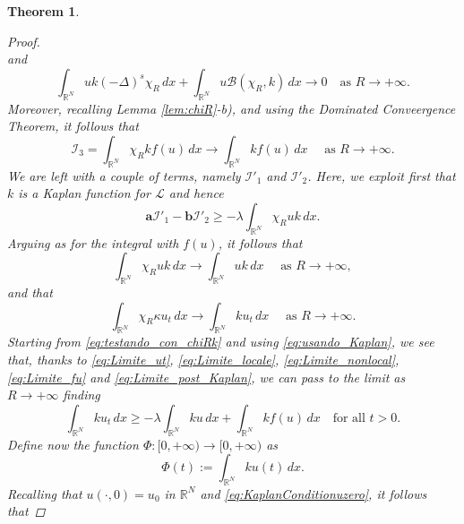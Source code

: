 \documentclass[11pt,a4paper,reqno]{amsart}
\theoremstyle{definition}
\theoremstyle{plain}
\newtheorem{theorem}[definition]{Theorem}
\numberwithin{equation}{section}
\begin{document}
\begin{theorem}
\begin{proof}
\begin{equation}
\end{equation}
\noindent and
\begin{equation}\label{eq:Limite_nonlocal}
	\int_{\mathbb{R}^{N}}uk (-\Delta)^s \chi_{R}\, dx + \int_{\mathbb{R}^{N}}u\mathcal{B}(\chi_{R},k)\, dx \to 0 \quad \textrm{as } R \to +\infty.
\end{equation}
Moreover, recalling Lemma \ref{lem:chiR}-b), and using the Dominated Conveergence Theorem, it follows that
\begin{equation}\label{eq:Limite_fu}
	\mathcal{I}_{3} = \int_{\mathbb{R}^N}\chi_R k f(u)\, dx \to \int_{\mathbb{R}^{N}}k f(u) \, dx \quad \textrm{ as } R \to +\infty.
\end{equation}
We are left with a couple of terms, namely $\mathcal{I}'_{1}$ and $\mathcal{I}'_{2}$. Here, we exploit first that $k$ is a Kaplan function for $\mathcal{L}$ and hence
\begin{equation}\label{eq:usando_Kaplan}
	\mathbf{a}\mathcal{I}'_{1} - \mathbf{b}\mathcal{I}'_{2} \geq -\lambda \int_{\mathbb{R}^{N}}\chi_R u k \, dx.
\end{equation}
Arguing as for the integral with $f(u)$, it follows that
\begin{equation}\label{eq:Limite_post_Kaplan}
	\int_{\mathbb{R}^{N}}\chi_R u k \, dx \to \int_{\mathbb{R}^{N}}u k \, dx \quad \textrm{ as } R \to +\infty,
\end{equation}
\noindent and that
\begin{equation}\label{eq:Limite_ut}
	\int_{\mathbb{R}^{N}}\chi_{R}\kappa u_{t}\, dx  \to \int_{\mathbb{R}^{N}}k u_t \, dx \quad \textrm{ as } R \to +\infty.
\end{equation}
Starting from \eqref{eq:testando_con_chiRk} and using \eqref{eq:usando_Kaplan},
we see that, thanks to \eqref{eq:Limite_ut}, \eqref{eq:Limite_locale}, \eqref{eq:Limite_nonlocal}, \eqref{eq:Limite_fu} and \eqref{eq:Limite_post_Kaplan}, we can pass to the limit as $R\to +\infty$ finding
\begin{equation}\label{eq:Dopo_il_Limite_in_R}
	\int_{\mathbb{R}^{N}}ku_t \, dx \geq -\lambda \int_{\mathbb{R}^{N}}k u \, dx + \int_{\mathbb{R}^{N}}k f(u)\, dx \quad \textrm{for all } t>0.
\end{equation}
Define now the function $\Phi:[0,+\infty)\to [0,+\infty)$
as
\begin{equation}\label{eq:Def_Phi}
	\Phi(t):= \int_{\mathbb{R}^{N}}k u(t) \, dx.
\end{equation}
Recalling that $u(\cdot,0)=u_0$ in $\mathbb{R}^N$ and \eqref{eq:KaplanConditionuzero}, it follows that

\end{proof}
\end{theorem}
\end{document}

